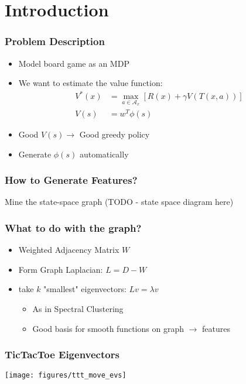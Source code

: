 \section{Introduction}

\begin{frame}
\frametitle{Problem Description}

\begin{itemize}
  \item Model board game as an MDP
  \item We want to estimate the value function:
    \begin{align*}
        V^{*}(x) &= \max_{a \in \mathcal{A}_x} [ R(x) + \gamma V(T(x, a)) ]\\
        V(s)     &= w^{T}\phi(s)
    \end{align*}
  \item Good $V(s) \rightarrow$ Good greedy policy
  \item Generate $\phi(s)$ automatically
\end{itemize}
\end{frame}

\begin{frame}
\frametitle{How to Generate Features?}
Mine the state-space graph
(TODO - state space diagram here)
\end{frame}

\begin{frame}
\frametitle{What to do with the graph?}
\begin{itemize}
  \item Weighted Adjacency Matrix $W$
  \item Form Graph Laplacian: $L = D-W $
  \item take $k$ "smallest" eigenvectors: $Lv = \lambda v$
    \begin{itemize}
        \item As in Spectral Clustering
        \item Good basis for smooth functions on graph $\rightarrow$ features 
    \end{itemize}
\end{itemize}
\end{frame}

\begin{frame}
\frametitle{TicTacToe Eigenvectors}
\texttt{[image: figures/ttt\_move\_evs]}
\end{frame}

